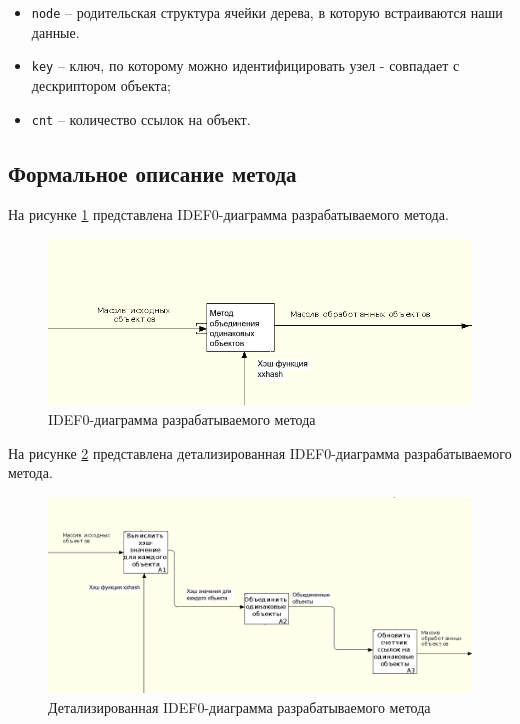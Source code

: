 
\begin{itemize}
	\item \texttt{node} -- родительская структура ячейки дерева, в которую встраиваются наши данные.
	\item \texttt{key} -- ключ, по которому можно идентифицировать узел - совпадает с дескриптором объекта;
	\item \texttt{cnt} -- количество ссылок на объект.
\end{itemize}

\subsection{Формальное описание метода}

На рисунке \ref{fig:idef0-0} представлена IDEF0-диаграмма разрабатываемого метода.

\begin{figure}[h]
	\centering
	\includegraphics[width=\textwidth]{img/idef0-0.png}
	\caption{IDEF0-диаграмма разрабатываемого метода}
	\label{fig:idef0-0}
\end{figure}

На рисунке \ref{fig:idef0-1} представлена детализированная IDEF0-диаграмма разрабатываемого метода.

\begin{figure}[h]
	\centering
	\includegraphics[width=\textwidth]{img/idef0-1.png}
	\caption{Детализированная IDEF0-диаграмма разрабатываемого метода}
	\label{fig:idef0-1}
\end{figure}


